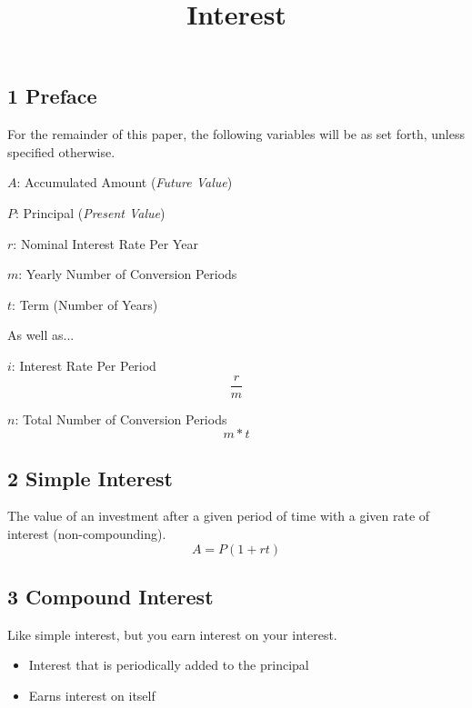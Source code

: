 \documentclass[twocolumn]{article}
\title{Interest}
\author{}
\date{}
\newenvironment{adescription}[1]
{\begin{list}{}%
		{\renewcommand\makelabel[1]{##1\hfill}%
			\settowidth\labelwidth{\makelabel{#1}}%
			\setlength\leftmargin{\labelwidth}
			\addtolength\leftmargin{\labelsep}}}
	{\end{list}}
\newcommand{\dquad}{\quad{}\quad{}}
\begin{document}
	\maketitle{}
	
	\subsection*{1 Preface}
	\quad{}For the remainder of this paper, the following variables will be as set forth, unless specified otherwise.
	
	\begin{adescription}{\quad{}$m$:}
		\item[\dquad{}$A$:] Accumulated Amount (\emph{Future Value})
		\item[\dquad{}$P$:] Principal (\emph{Present Value})
		\item[\dquad{}$r$:] Nominal Interest Rate Per Year
		\item[\dquad{}$m$:] Yearly Number of Conversion Periods
		\item[\dquad{}$t$:] Term (Number of Years)
		\item[\quad{}As well as...]
		\item[\dquad{}$i$:] Interest Rate Per Period
		\begin{equation}
			\frac{r}{m}
		\end{equation}
		\item[\dquad{}$n$:] Total Number of Conversion Periods
		\begin{equation}
			m * t
		\end{equation}
	\end{adescription}
	
	\subsection*{2 Simple Interest}
	The value of an investment after a given period of time with a given rate of interest (non-compounding).
	\begin{equation}
		A = P(1 + rt)
	\end{equation}
	
	\subsection*{3 Compound Interest} 
	Like simple interest, but you earn interest on your interest.
	\begin{itemize}[label=--]
		\item Interest that is periodically added to the principal
		\item Earns interest on itself
	\end{itemize}
	
\end{document}
